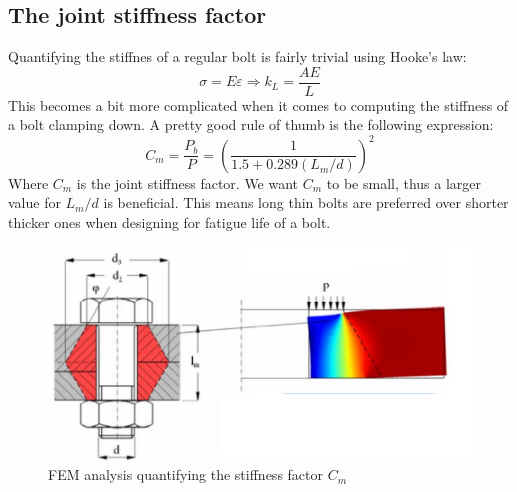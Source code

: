 \documentclass[11pt, a4paper]{article}
\renewcommand*{\epsilon}{\varepsilon}
\begin{document}
\subsection{The joint stiffness factor}
Quantifying the stiffnes of a regular bolt is fairly trivial using Hooke's law:
\begin{equation}
  \sigma = E\epsilon \Rightarrow k_L = \frac{AE}{L}
\end{equation}
This becomes a bit more complicated when it comes to computing the stiffness of a bolt clamping down. A pretty good rule of thumb is the following expression:
\begin{equation}
  C_m = \frac{P_b}{P} = \left( \frac{1}{1.5+0.289(L_m/d)} \right)^2  
\end{equation}
Where $C_m$ is the joint stiffness factor. We want $C_m$ to be small, thus a larger value for $L_m/d$ is beneficial. This means long thin bolts are preferred over shorter thicker ones when designing for fatigue life of a bolt.
\begin{figure}[H]
  \centerline{\includegraphics[width=120mm]{images/CM.png}}
  \caption{FEM analysis quantifying the stiffness factor $C_m$}
\end{figure}
\end{document}
